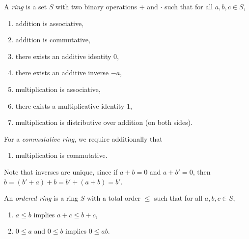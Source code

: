 \begin{definition}[Ring] \label{def:ring}
    A \emph{ring} is a set $S$ with two binary operations $+$ and $\cdot$ such
    that for all $a, b, c \in S$,
    \begin{enumerate}[label=\small(R\arabic*)]
        \item addition is associative, \label{def:ring:asso}
        \item addition is commutative, \label{def:ring:comm}
        \item there exists an additive identity $0$, \label{def:ring:zero}
        \item there exists an additive inverse $-a$, \label{def:ring:inverse}
        \item multiplication is associative, \label{def:ring:mult_asso}
        \item there exists a multiplicative identity $1$, \label{def:ring:one}
        \item multiplication is distributive over addition (on both sides).
        \label{def:ring:dist}
    \end{enumerate}
    For a \emph{commutative ring}, we require additionally that
    \begin{enumerate}[label=\small(CR\arabic*)]
        \item multiplication is commutative. \label{def:ring:mult_comm}
    \end{enumerate}
\end{definition}
Note that inverses are unique, since if $a + b = 0$ and $a + b' = 0$, then
$b = (b' + a) + b = b' + (a + b) = b'$.

\begin{definition} \label{def:ordered_ring}
    An \emph{ordered ring} is a ring $S$ with a total order $\le$ such that
    for all $a, b, c \in S$,
    \begin{enumerate}[label=\small(OR\arabic*)]
        \item $a \le b$ implies $a + c \le b + c$,
            \label{def:ordered_ring:sum}
        \item $0 \le a$ and $0 \le b$ implies $0 \le ab$.
            \label{def:ordered_ring:prod}
    \end{enumerate}
\end{definition}

